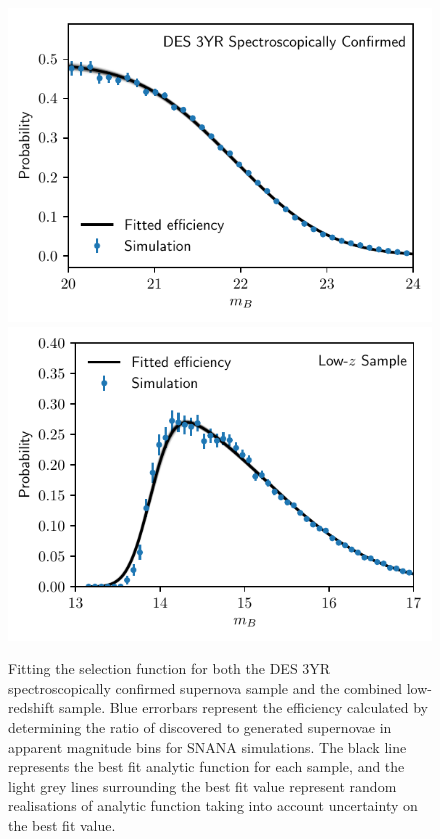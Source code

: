 \documentclass[a4paper,fleqn,usenatbib]{mnras}
\begin{document}
\begin{figure}
	\begin{center}
		\includegraphics[width=\columnwidth]{DES3YR_DES_BHMEFF_AMG10.pdf}
		\includegraphics[width=\columnwidth]{DES3YR_LOWZ_BHMEFF_G10.pdf}
	\end{center}
	\caption{Fitting the selection function for both the DES 3YR spectroscopically confirmed supernova sample and the combined low-redshift sample. Blue errorbars represent the efficiency calculated by determining the ratio of discovered to generated supernovae in apparent magnitude bins for SNANA simulations. The black line represents the best fit analytic function for each sample, and the light grey lines surrounding the best fit value represent random realisations of analytic function taking into account uncertainty on the best fit value.}
	\label{fig:sf_snana}
\end{figure}
\end{document}
